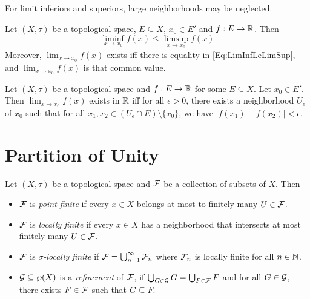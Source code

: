 \documentclass[screen,single]{techreport}
\numberwithin{equation}{section}
\begin{document}
\begin{remark}\label{Rem:LimitInfAndSupNeglectLargeNeigh}
	For limit inferiors and superiors, large neighborhoods may be neglected.
\end{remark}

\begin{theorem}\label{The:LimInfLeLimSup}
	Let $(X,\tau)$ be a topological space, $E \subseteq X$, $x_0 \in E'$ and $f : E \to \mathbb{R}$.
	Then
	\begin{equation}
		\liminf_{x \to x_0} f(x) \le \limsup_{x \to x_0} f(x) \label{Eq:LimInfLeLimSup}
	\end{equation}
	Moreover, $\lim_{x \to x_0} f(x)$ exists iff there is equality in \eqref{Eq:LimInfLeLimSup}, and $\lim_{x \to x_0} f(x)$ is that common value.
\end{theorem}

\begin{theorem}\label{The:CauchyLemma}
  Let $(X,\tau)$ be a topological space and $f : E \to \mathbb{R}$ for some $E \subseteq X$.
  Let $x_0 \in E'$.
  Then $\lim_{x \to x_0} f(x)$ exists in $\mathbb{R}$ iff for all $\epsilon > 0$, there exists a neighborhood $U_\epsilon$ of $x_0$ such that for all $x_1,x_2 \in (U_\epsilon \cap E) \setminus \{ x_0 \}$, we have $|f(x_1)-f(x_2)| < \epsilon$.
\end{theorem}

\section{Partition of Unity}

\begin{definition}\label{De:RelatedDefsOfPartiOfUnity}
  Let $(X,\tau)$ be a topological space and $\mathcal{F}$ be a collection of subsets of $X$.
  Then
  \begin{itemize}
    \item $\mathcal{F}$ is \emph{point finite} if every $x \in X$ belongs at most to finitely many $U \in \mathcal{F}$.
    \item $\mathcal{F}$ is \emph{locally finite} if every $x \in X$ has a neighborhood that intersects at most finitely many $U \in \mathcal{F}$.
    \item $\mathcal{F}$ is \emph{$\sigma$-locally finite} if $\mathcal{F} = \bigcup_{n=1}^\infty \mathcal{F}_n$ where $\mathcal{F}_n$ is locally finite for all $n \in \mathbb{N}$.
    \item $\mathcal{G} \subseteq \wp(X)$ is a \emph{refinement} of $\mathcal{F}$, if $\bigcup_{G \in \mathcal{G}} G = \bigcup_{F \in \mathcal{F}} F$ and for all $G \in \mathcal{G}$, there exists $F \in \mathcal{F}$ such that $G \subseteq F$.
  \end{itemize}
\end{definition}
\end{document}
